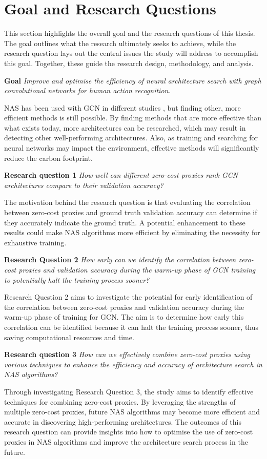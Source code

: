 \section{Goal and Research Questions}\label{section:goalsandrq}

This section highlights the overall goal and the research questions of this thesis. The goal outlines what the research ultimately seeks to achieve, while the research question lays out the central issues the study will address to accomplish this goal. Together, these guide the research design, methodology, and analysis. 

\textbf{Goal} \textit{Improve and optimise the efficiency of neural architecture search with graph convolutional networks for human action recognition.} 

\gls{NAS} has been used with \gls{GCN} in different studies \autocite{zhou2019auto, groos2022toward, peng2020learning}, but finding other, more efficient methods is still possible. By finding methods that are more effective than what exists today, more architectures can be researched, which may result in detecting other well-performing architectures. Also, as training and searching for neural networks may impact the environment, effective methods will significantly reduce the carbon footprint. 


\textbf{Research question 1} \textit{How well can different zero-cost proxies rank \gls{GCN} architectures compare to their validation accuracy?}

The motivation behind the research question is that evaluating the correlation between zero-cost proxies and ground truth validation accuracy can determine if they accurately indicate the ground truth. A potential enhancement to these results could make NAS algorithms more efficient by eliminating the necessity for exhaustive training.

\textbf{Research Question 2} \textit{How early can we identify the correlation between zero-cost proxies and validation accuracy during the warm-up phase of \gls{GCN} training to potentially halt the training process sooner?}


Research Question 2 aims to investigate the potential for early identification of the correlation between zero-cost proxies and validation accuracy during the warm-up phase of training for \gls{GCN}. The aim is to determine how early this correlation can be identified because it can halt the training process sooner, thus saving computational resources and time.


\textbf{Research question 3} \textit{How can we effectively combine zero-cost proxies using various techniques to enhance the efficiency and accuracy of architecture search in \gls{NAS} algorithms?}

Through investigating Research Question 3, the study aims to identify effective techniques for combining zero-cost proxies. By leveraging the strengths of multiple zero-cost proxies, future \gls{NAS} algorithms may become more efficient and accurate in discovering high-performing architectures. The outcomes of this research question can provide insights into how to optimise the use of zero-cost proxies in \gls{NAS} algorithms and improve the architecture search process in the future.